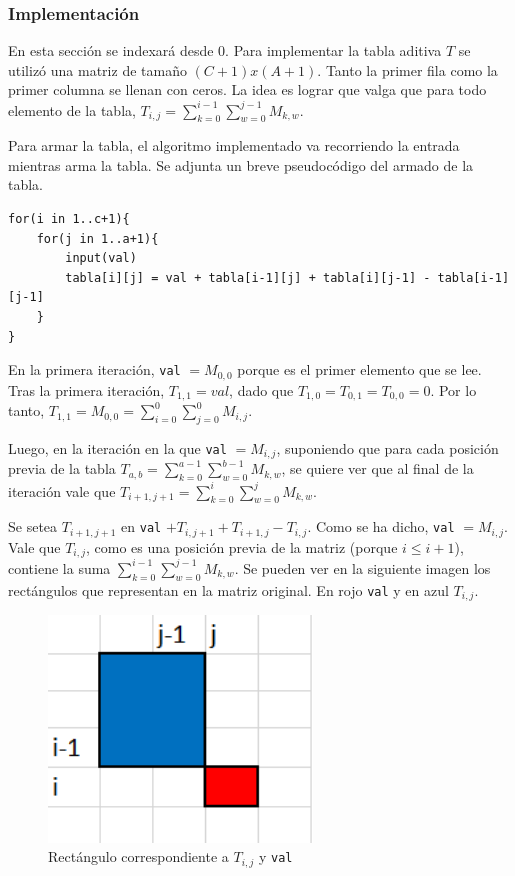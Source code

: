 \subsubsection{Implementación}

En esta sección se indexará desde 0. Para implementar la tabla aditiva $T$ se utilizó una matriz de tamaño $(C+1)x(A+1)$. Tanto la primer fila como la primer columna se llenan con ceros. La idea es lograr que valga que para todo elemento de la tabla, $T_{i,j} = \sum_{k=0}^{i-1} \sum_{w=0}^{j-1} M_{k,w}$.

Para armar la tabla, el algoritmo implementado va recorriendo la entrada mientras arma la tabla. Se adjunta un breve pseudocódigo del armado de la tabla.

\begin{verbatim}
for(i in 1..c+1){
    for(j in 1..a+1){
        input(val)
        tabla[i][j] = val + tabla[i-1][j] + tabla[i][j-1] - tabla[i-1][j-1]
    }
}    
\end{verbatim}

En la primera iteración, \texttt{val} $= M_{0,0}$ porque es el primer elemento que se lee. Tras la primera iteración, $T_{1,1} = val$, dado que $T_{1,0} = T_{0,1} = T_{0,0} = 0$. Por lo tanto, $T_{1,1} = M_{0,0} = \sum_{i=0}^{0} \sum_{j=0}^{0} M_{i,j}$.

Luego, en la iteración en la que \texttt{val} $= M_{i,j}$, suponiendo que para cada posición previa de la tabla $T_{a,b} = \sum_{k=0}^{a-1} \sum_{w=0}^{b-1} M_{k,w}$, se quiere ver que al final de la iteración vale que $T_{i+1,j+1} = \sum_{k=0}^{i} \sum_{w=0}^{j} M_{k,w}$.

Se setea $T_{i+1,j+1}$ en \texttt{val} $+ T_{i,j+1} + T_{i+1,j} - T_{i,j}$. Como se ha dicho, \texttt{val} $= M_{i,j}$. Vale que $T_{i,j}$, como es una posición previa de la matriz (porque $i \leq i+1$), contiene la suma $\sum_{k=0}^{i-1} \sum_{w=0}^{j-1} M_{k,w}$. Se pueden ver en la siguiente imagen los rectángulos que representan en la matriz original. En rojo \texttt{val} y en azul $T_{i,j}$.

\begin{figure}[H]
\centering
\includegraphics[width=7cm]{Imagenes/Ej3f.png}
\caption{Rectángulo correspondiente a $T_{i,j}$ y \texttt{val}}
\end{figure}

